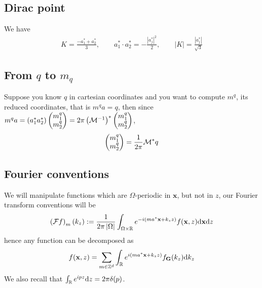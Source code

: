 \documentclass[11pt,a4paper,reqno,french,tikz]{amsart}
\def\d{{\rm d}}
\newcommand{\pa}[1]{\left( #1 \right)} %
\newcommand{\ab}[1]{\left|#1\right|} %
\newcommand{\f}[2]{\frac{#1}{#2}} %
\newcommand{\mat}[1]{\begin{pmatrix} #1 \end{pmatrix}} %
\def\bG{{\mathbf G}}
\def\bx{{\mathbf x}}
\begin{document}
\subsection{Dirac point}%
\label{sub:dirac_point}

We have
\begin{align*}
K = \f{-a_1^* +a_2^*}{3}, \qquad a_1^*\cdot a_2^* = -\f{|a_j^*|^2}{2}, \qquad \ab{K} = \f{|a_j^*|}{\sqrt 3}
\end{align*}

\subsection{From $q$ to $m_q$}%
\label{sub:from_q_to_m_q_}

Suppose you know $q$ in cartesian coordinates and you want to compute $m^q$, its reduced coordinates, that is $m^q a = q$, then since $m^q a = \pa{a_1^* a_2^*} \mat{m^q_1 \\ m^q_2} = 2\pi \pa{\cM^{-1}}^* \mat{m^q_1 \\ m^q_2}$,
\begin{align}\label{eq:inv_q}
\mat{m^q_1 \\ m^q_2} = \f{1}{2\pi} \cM^* q
\end{align}

\subsection{Fourier conventions}%
\label{sub:fourier_conventions}

We will manipulate functions which are $\Omega$-periodic in $\bx$, but not in $z$, our Fourier transform conventions will be
\begin{align*}
	\pa{\cF f}_m(k_z) := \f{1}{2\pi \ab{\Omega}} \int_{\Omega\times\R} e^{-i\pa{ma^* \bx + k_z z}} f(\bx,z) \d \bx \d z
\end{align*}
hence any function can be decomposed as
\begin{align*}
f(\bx,z) = \sum_{m \in \Z^d} \int_\R e^{i\pa{ma^* \bx + k_z z}} f_\bG(k_z) \d k_z
\end{align*}
We also recall that $\int_\R e^{ipz} \d z = 2\pi \delta(p)$.
\end{document}
